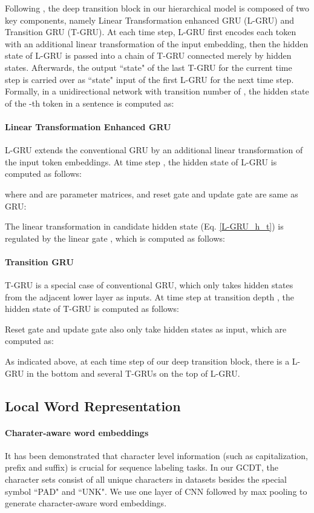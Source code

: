 \documentclass[11pt,a4paper]{article}
\begin{document}
Following \citeauthor{DTMT} , the deep transition block in our hierarchical model is composed of two key components, namely Linear Transformation enhanced GRU (L-GRU) and Transition GRU (T-GRU). At each time step, L-GRU first encodes each token with an additional linear transformation of the input embedding, then the hidden state of L-GRU is passed into a chain of T-GRU connected merely by hidden states. Afterwards, the output ``state" of the last T-GRU for the current time step is carried over as ``state" input of the first L-GRU for the next time step. Formally, in a unidirectional network with transition number of , the hidden state of the -th token in a sentence is computed as:


\paragraph{Linear Transformation Enhanced GRU}
L-GRU extends the conventional GRU by an additional linear transformation of the input token embeddings. At time step , the hidden state of L-GRU is computed as follows:

where  and  are parameter matrices, and reset gate  and update gate  are same as GRU:

The linear transformation  in candidate hidden state  (Eq. \ref{L-GRU_h_t}) is regulated by the linear gate , which is computed as follows:

\paragraph{Transition GRU} T-GRU is a special case of conventional GRU, which only takes hidden states from the adjacent lower layer as inputs. At time step  at transition depth , the hidden state of T-GRU is computed as follows:


Reset gate  and update gate  also only take hidden states as input, which are computed as:


As indicated above, at each time step of our deep transition block, there is a L-GRU in the bottom and several T-GRUs on the top of L-GRU.

\subsection{Local Word Representation}
\paragraph{Charater-aware word embeddings} 
It has been demonstrated that character level information (such as capitalization, prefix and suffix) \cite{collobert2011,first_CNN} is crucial for sequence labeling tasks. In our GCDT, the character sets consist of all unique characters in datasets besides the special symbol ``PAD" and ``UNK". We use one layer of CNN followed by max pooling to generate character-aware word embeddings.
\end{document}
